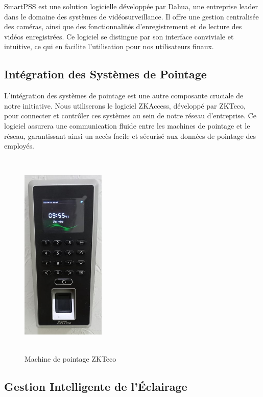 SmartPSS est une solution logicielle développée par Dahua, une entreprise leader dans le domaine des systèmes de vidéosurveillance. Il offre une gestion centralisée des caméras, ainsi que des fonctionnalités d'enregistrement et de lecture des vidéos enregistrées. Ce logiciel se distingue par son interface conviviale et intuitive, ce qui en facilite l'utilisation pour nos utilisateurs finaux.

\subsection{Intégration des Systèmes de Pointage}

L'intégration des systèmes de pointage est une autre composante cruciale de notre initiative. Nous utiliserons le logiciel ZKAccess, développé par ZKTeco, pour connecter et contrôler ces systèmes au sein de notre réseau d'entreprise. Ce logiciel assurera une communication fluide entre les machines de pointage et le réseau, garantissant ainsi un accès facile et sécurisé aux données de pointage des employés.

\begin{figure}[H]
\centering
\includegraphics[height=10cm,width=4cm]{Images/BRades-Pointage.jpg}
\caption{Machine de pointage ZKTeco}
\label{Chap4.2.5}
\end{figure}
\smallskip

\subsection{Gestion Intelligente de l'Éclairage}

